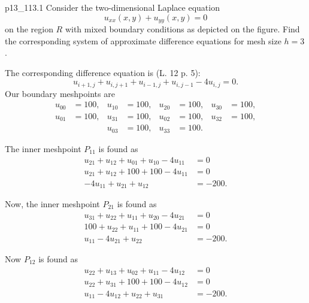 
\begin{problemwithimage}{p13_1}{13.1}
  Consider the two-dimensional Laplace equation
  \begin{equation*}
    u_{x x}(x,y) + u_{y y}(x,y) = 0
  \end{equation*}
  on the region $R$ with mixed boundary conditions as depicted on the figure.
  Find the corresponding system of approximate difference equations for mesh size $h = 3$.
\end{problemwithimage}

\begin{derivation}
  The corresponding difference equation is (L. 12 p. 5):
  \begin{equation*}
    u_{i + 1,j} + u_{i,j+1} + u_{i-1,j} + u_{i,j-1} - 4u_{i,j} = 0
  .\end{equation*}
  Our boundary meshpoints are
  \begin{align*}
    u_{00} &= 100, & u_{10} &= 100, & u_{20} &= 100, & u_{30} &= 100, \\
    u_{01} &= 100, & u_{31} &= 100, & u_{02} &= 100, & u_{32} &= 100, \\
           &&  u_{03} &= 100, & u_{33} &= 100. &&
  \end{align*}

  The inner meshpoint $P_{11}$ is found as
  \begin{align*}
    u_{21} + u_{12} + u_{01} + u_{10} - 4u_{11} &= 0 \\
    u_{21} + u_{12} + 100 + 100 - 4u_{11} &= 0 \\
    -4u_{11} + u_{21} + u_{12} &= -200
  .\end{align*}
  
  Now, the inner meshpoint $P_{21}$ is found as
  \begin{align*}
    u_{31} + u_{22} + u_{11} + u_{20} - 4u_{21} &= 0 \\
    100 + u_{22} + u_{11} + 100 - 4u_{21} &= 0 \\
    u_{11} - 4u_{21} + u_{22} &= -200
  .\end{align*}

  Now $P_{12}$ is found as
  \begin{align*}
    u_{22} + u_{13} + u_{02} + u_{11} - 4u_{12} &= 0 \\
    u_{22} + u_{31} + 100 + 100 - 4u_{12} &= 0 \\
    u_{11} -4u_{12} + u_{22} + u_{31} &= -200
  .\end{align*}
  

\end{derivation}
